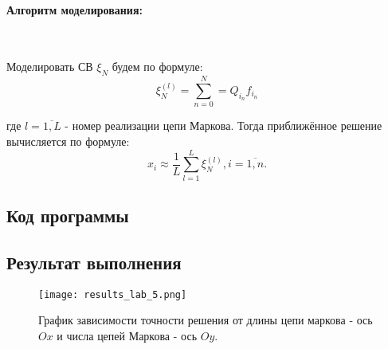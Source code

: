 \paragraph{Алгоритм моделирования:}\
\

Моделировать СВ $\xi_{N}$ будем по формуле:
\begin{equation}
\xi_{N}^{(l)}=\sum\limits_{n=0}^{N}=Q_{i_{n}}f_{i_{n}}
\end{equation}

где $l=\overline{1,L}$ - номер реализации цепи Маркова. Тогда приближённое решение вычисляется по формуле:
\begin{equation}
x_{i} \approx \frac{1}{L}\sum\limits_{l=1}^{L}\xi_{N}^{(l)}, i = \overline{1,n}.
\end{equation}

\subsection{Код программы}



\subsection{Результат выполнения}

\begin{figure}[H]
	\texttt{[image: results\_lab\_5.png]}
	\label{fig:results_lab_5}
	\caption{График зависимости точности решения от длины цепи маркова - ось $Ox$ и числа цепей Маркова - ось $Oy$.}
\end{figure}
